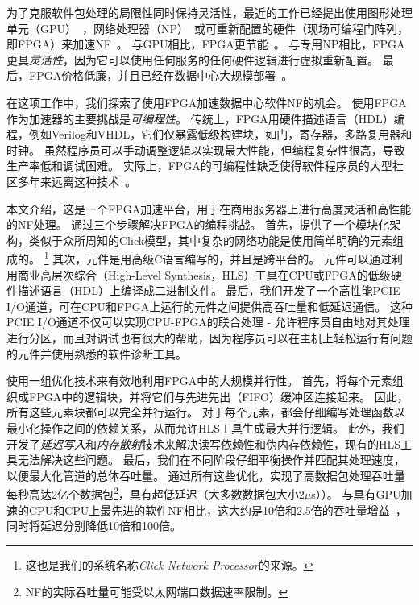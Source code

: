 为了克服软件包处理的局限性同时保持灵活性，最近的工作已经提出使用图形处理单元（GPU）~\cite{packetshader}，网络处理器（NP）~\cite {cavium,netronome}或可重新配置的硬件（现场可编程门阵列，即FPGA）来加速NF~\cite{netfpga,smartnic,rubow2010chimpp}。
与GPU相比，FPGA更节能~\cite {fpga-vs-gpu,fpga-vs-gpu2}。
与专用NP相比，FPGA更具\emph{灵活性}，因为它可以使用任何服务的任何硬件逻辑进行虚拟重新配置。
最后，FPGA价格低廉，并且已经在数据中心大规模部署~\cite {smartnic,putnam2014reconfigurable}。

在这项工作中，我们探索了使用FPGA加速数据中心软件NF的机会。
使用FPGA作为加速器的主要挑战是\textit{可编程性}。
传统上，FPGA用硬件描述语言（HDL）编程，例如Verilog和VHDL，它们仅暴露低级构建块，如门，寄存器，多路复用器和时钟。
虽然程序员可以手动调整逻辑以实现最大性能，但编程复杂性很高，导致生产率低和调试困难。
实际上，FPGA的可编程性缺乏使得软件程序员的大型社区多年来远离这种技术~\cite{bacon2013fpga}。

本文介绍\name{}，这是一个FPGA加速平台，用于在商用服务器上进行高度灵活和高性能的NF处理。
\name{}通过三个步骤解决FPGA的编程挑战。
首先，提供了一个模块化架构，类似于众所周知的Click模型\cite {kohler2000click}，其中复杂的网络功能是使用简单明确的元素组成的。
\footnote{这也是我们的系统名称\textit{Click Network Processor}的来源。}
其次，\name 元件是用高级C语言编写的，并且是跨平台的。
\name 元件可以通过利用商业高层次综合（High-Level Synthesis，HLS）工具\cite {vivado,aoc,sdaccel}在CPU或FPGA的低级硬件描述语言（HDL）上编译成二进制文件。
最后，我们开发了一个高性能PCIE I/O通道，可在CPU和FPGA上运行的元件之间提供高吞吐量和低延迟通信。
这种PCIE I/O通道不仅可以实现CPU-FPGA的联合处理 - 允许程序员自由地对其处理进行分区，而且对调试也有很大的帮助，因为程序员可以在主机上轻松运行有问题的元件并使用熟悉的软件诊断工具。

\name{}使用一组优化技术来有效地利用FPGA中的大规模并行性。
首先，\name{}将每个元素组织成FPGA中的逻辑块，并将它们与先进先出（FIFO）缓冲区连接起来。
因此，所有这些元素块都可以完全并行运行。
对于每个元素，都会仔细编写处理函数以最小化操作之间的依赖关系，从而允许HLS工具生成最大并行逻辑。
此外，我们开发了\textit {延迟写入}和\textit {内存散射}技术来解决读写依赖性和伪内存依赖性，现有的HLS工具无法解决这些问题。
最后，我们在不同阶段仔细平衡操作并匹配其处理速度，以便最大化管道的总体吞吐量。
通过所有这些优化，\name{}实现了高数据包处理吞吐量
每秒高达2亿个数据包\footnote {\name{} NF的实际吞吐量可能受以太网端口数据速率限制。}，具有超低延迟（大多数数据包大小$ 2 \mu$s））。
与具有GPU加速的CPU和CPU上最先进的软件NF相比，这大约是10倍和2.5倍的吞吐量增益~\cite {packetshader}，
同时将延迟分别降低10倍和100倍。

